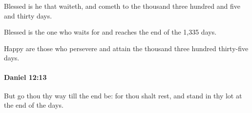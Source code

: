 			\begin{versebox}
					\item[BHS] 
					\item[LXX] 
					\item[ASV] Blessed is he that waiteth, and cometh to the thousand three hundred and five and thirty days.
					\item[NIV] Blessed is the one who waits for and reaches the end of the 1,335 days.
					\item[NRSV] Happy are those who persevere and attain the thousand three hundred thirty-five days.
			\end{versebox}

		\paragraph{Daniel 12:13} %
			\label{DANIEL-12-13}

			But go thou thy way till the end be: for thou shalt rest, and stand in thy lot at the end of the days.

